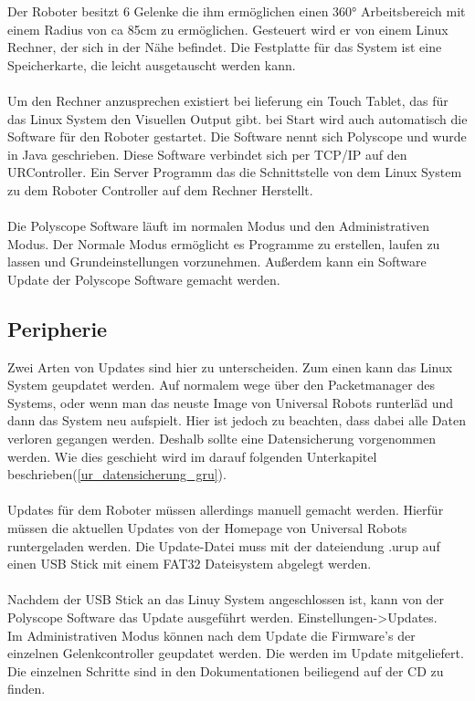 Der Roboter besitzt 6 Gelenke die ihm ermöglichen einen 360° Arbeitsbereich mit einem Radius von ca 85cm zu ermöglichen. Gesteuert wird er von einem Linux Rechner, der sich in der Nähe befindet. 
Die Festplatte für das System ist eine Speicherkarte, die leicht ausgetauscht werden kann.
\\\\
Um den Rechner anzusprechen existiert bei lieferung ein Touch Tablet, das für das Linux System den Visuellen Output gibt. bei Start wird auch automatisch die Software für den Roboter gestartet. Die Software nennt sich Polyscope und wurde in Java geschrieben. Diese Software verbindet sich per TCP/IP auf den URController. Ein Server Programm das die Schnittstelle von dem Linux System zu dem Roboter Controller auf dem Rechner Herstellt.
\\\\
Die Polyscope Software läuft im normalen Modus und den Administrativen Modus. Der Normale Modus ermöglicht es Programme zu erstellen, laufen zu lassen und Grundeinstellungen vorzunehmen. Außerdem kann ein Software Update der Polyscope Software gemacht werden.

\subsection{Peripherie}
\label{ur_update_gru}

Zwei Arten von Updates sind hier zu unterscheiden. Zum einen kann das Linux System geupdatet werden. Auf normalem wege über den Packetmanager des Systems, oder wenn man das neuste Image von Universal Robots runterläd und dann das System neu aufspielt. Hier ist jedoch zu beachten, dass dabei alle Daten verloren gegangen werden. Deshalb sollte eine Datensicherung vorgenommen werden. Wie dies geschieht wird im darauf folgenden Unterkapitel beschrieben(\ref{ur_datensicherung_gru}).
\\\\
Updates für dem Roboter müssen allerdings manuell gemacht werden. Hierfür müssen die aktuellen Updates von der Homepage von Universal Robots runtergeladen werden. Die Update-Datei muss mit der dateiendung .urup auf einen USB Stick mit einem FAT32 Dateisystem abgelegt werden.\\\\
Nachdem der USB Stick an das Linuy System angeschlossen ist, kann von der Polyscope Software das Update ausgeführt werden. Einstellungen->Updates.\\
Im Administrativen Modus können nach dem Update die Firmware's der einzelnen Gelenkcontroller geupdatet werden. Die werden im Update mitgeliefert. Die einzelnen Schritte sind in den Dokumentationen beiliegend auf der CD zu finden.

